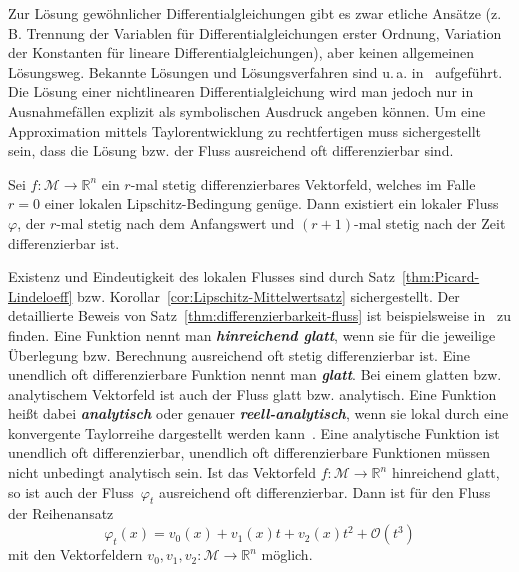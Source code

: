\medskip{}
Zur Lösung gewöhnlicher Differentialgleichungen gibt es zwar etliche
Ansätze (z.\,B. Trennung der Variablen für Differentialgleichungen
erster Ordnung, Variation der Konstanten für lineare Differentialgleichungen),
aber keinen allgemeinen Lösungsweg. Bekannte Lösungen und Lösungsverfahren
sind u.\,a. in~\cite{kamke1983,polianin2002} aufgeführt. Die Lösung
einer nichtlinearen Differentialgleichung wird man jedoch nur in Ausnahmefällen
explizit als symbolischen Ausdruck angeben können. Um eine Approximation
mittels Taylorentwicklung zu rechtfertigen muss sichergestellt sein,
dass die Lösung bzw. der Fluss ausreichend oft differenzierbar sind.
\begin{theorem}
\label{thm:differenzierbarkeit-fluss}Sei
$f:\mathcal{M}\to{\mathbb{R}}^{n}$ ein $r$-mal stetig differenzierbares Vektorfeld,
welches im Falle $r=0$ einer lokalen Lipschitz-Bedingung genüge.
Dann existiert ein lokaler Fluss~$\varphi$, der $r$-mal stetig
nach dem Anfangswert und $(r+1)$-mal stetig nach der Zeit differenzierbar
ist.
\end{theorem}
Existenz und Eindeutigkeit des lokalen Flusses sind durch Satz~\ref{thm:Picard-Lindeloeff}
bzw. Korollar~\ref{cor:Lipschitz-Mittelwertsatz} sichergestellt.
Der detaillierte Beweis von Satz~\ref{thm:differenzierbarkeit-fluss}
ist beispielsweise in~\cite{broecker1992,arnold2001,fischer2014band2}
zu finden. Eine Funktion nennt man \textbf{\em hinreichend glatt},
wenn sie für die jeweilige Überlegung bzw. Berechnung ausreichend
oft stetig differenzierbar ist.
Eine unendlich oft differenzierbare
Funktion nennt man \textbf{\em glatt}. Bei einem glatten bzw. analytischem
Vektorfeld ist auch der Fluss glatt bzw. analytisch. Eine Funktion
heißt dabei \textbf{\em analytisch} oder genauer
\textbf{\em reell-analytisch}, wenn sie lokal durch eine konvergente Taylorreihe
dargestellt werden kann~\cite{koenigsberger2-2004}. Eine analytische
Funktion ist unendlich oft differenzierbar, unendlich oft differenzierbare
Funktionen müssen nicht unbedingt analytisch sein.
Ist das Vektorfeld $f:\mathcal{M}\to{\mathbb{R}}^{n}$ hinreichend glatt, so
ist auch der Fluss~$\varphi_{t}$ ausreichend oft differenzierbar.
Dann ist für den Fluss der Reihenansatz
\begin{equation}
\varphi_{t}(x)=v_{0}(x)+v_{1}(x)t+v_{2}(x)t^{2}+\mathcal{O}(t^{3})\label{eq:Ansatz-Reihenentwicklung-Fluss}
\end{equation}
mit den Vektorfeldern $v_{0},v_{1},v_{2}:\mathcal{M}\to{\mathbb{R}}^{n}$ möglich.

